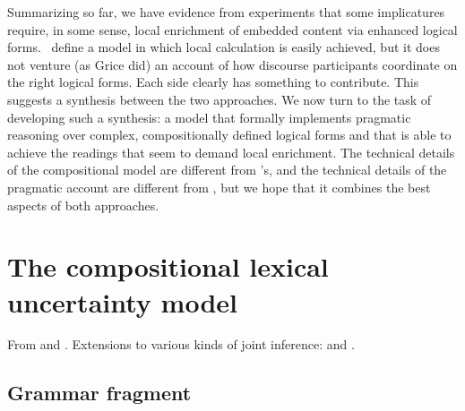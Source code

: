 \documentclass{article}
\begin{document}
Summarizing so far, we have evidence from
 experiments that some implicatures
require, in some sense, local enrichment of embedded content via
enhanced logical forms.  \CFS\ define a model in which local
calculation is easily achieved, but it does not venture (as Grice did)
an account of how discourse participants coordinate on the right
logical forms. Each side clearly has something to contribute.  This
suggests a synthesis between the two approaches. We now turn to the
task of developing such a synthesis: a model that formally implements
pragmatic reasoning over complex, compositionally defined logical
forms and that is able to achieve the readings that seem to demand
local enrichment. The technical details of the compositional model
are different from \CFS's, and the technical details of the 
pragmatic account are different from \citeauthor{Grice75}, but we hope
that it combines the best aspects of both approaches.


\section{The compositional lexical uncertainty model}\label{sec:model}

From \citet{Bergen:Goodman:Levy:2012} and
\citet{Bergen:Levy:Goodman:2014}. Extensions to various kinds of joint
inference: \citet{Smith:Goodman:Frank:2013} and \citet{Kao-etal:2014}.


\subsection{Grammar fragment}
\end{document}
